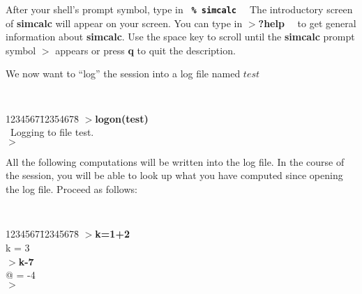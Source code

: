 After your shell's prompt symbol, type in
\leer
{\tt
  {\bf \% simcalc } \care
}
\leer
The introductory screen of {\bf simcalc} will appear on your screen.
You can type in
\leer
$>${\bf ?help}\ \ \care
\leer
to get general information about {\bf simcalc}. Use the space key to scroll
until the {\bf simcalc} prompt symbol $>$ appears or press {\bf q}
to quit the description.

We now want to ``log'' the session into a log file named $test$
\leer
{\tt
  \begin{tabbing}
  1234567\=12354678\=\kill
  $>${\bf logon(test)}\ \ \care\\
  \ Logging to file test.\\
  $>$
  \end{tabbing}
}
\leer
All the following computations will be written into the log file.
In the course of the session, you will be able to look up what you have
computed since opening the log file. Proceed as follows:
{\tt
  \begin{tabbing}
  1234567\=12345678\=\kill
  $>${\bf k=1+2}\ \ \care\\
  \> k = 3\\
  $>${\bf k-7}\ \ \care\\
  \> @ = -4\\
  $>$
  \end{tabbing}
}

